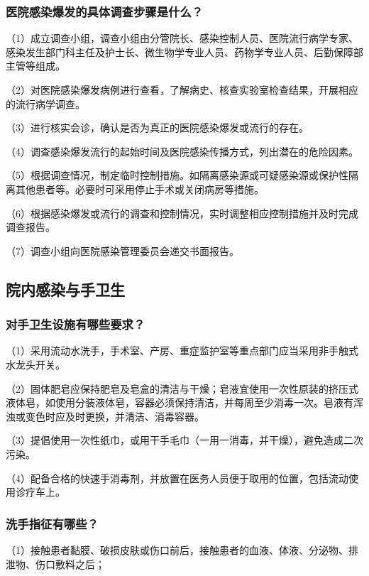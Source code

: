 \subsubsection{医院感染爆发的具体调查步骤是什么？}

（1）成立调查小组，调查小组由分管院长、感染控制人员、医院流行病学专家、感染发生部门科主任及护士长、微生物学专业人员、药物学专业人员、后勤保障部主管等组成。

（2）对医院感染爆发病例进行查看，了解病史、核查实验室检查结果，开展相应的流行病学调查。

（3）进行核实会诊，确认是否为真正的医院感染爆发或流行的存在。

（4）调查感染爆发流行的起始时间及医院感染传播方式，列出潜在的危险因素。

（5）根据调查情况，制定临时控制措施。如隔离感染源或可疑感染源或保护性隔离其他患者等。必要时可采用停止手术或关闭病房等措施。

（6）根据感染爆发或流行的调查和控制情况，实时调整相应控制措施并及时完成调查报告。

（7）调查小组向医院感染管理委员会递交书面报告。

\subsection{院内感染与手卫生}

\subsubsection{对手卫生设施有哪些要求？}

（1）采用流动水洗手，手术室、产房、重症监护室等重点部门应当采用非手触式水龙头开关。

（2）固体肥皂应保持肥皂及皂盒的清洁与干燥；皂液宜使用一次性原装的挤压式液体皂，如使用分装液体皂，容器必须保持清洁，并每周至少消毒一次。皂液有浑浊或变色时应及时更换，并清洁、消毒容器。

（3）提倡使用一次性纸巾，或用干手毛巾（一用一消毒，并干燥），避免造成二次污染。

（4）配备合格的快速手消毒剂，并放置在医务人员便于取用的位置，包括流动使用诊疗车上。

\subsubsection{洗手指征有哪些？}

（1）接触患者黏膜、破损皮肤或伤口前后，接触患者的血液、体液、分泌物、排泄物、伤口敷料之后；

